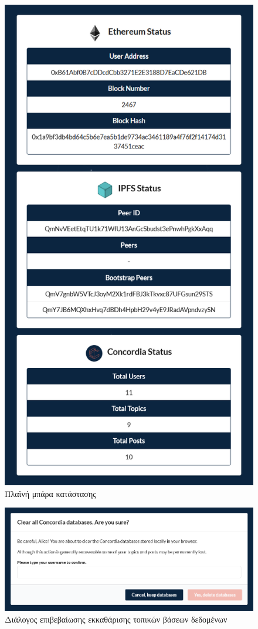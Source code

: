 \begin{figure}[H]
	\centering
	\includegraphics[width=.75\textwidth]{assets/figures/appendix-a/screenshot-10-status-sidebar}
	\caption{Πλαϊνή μπάρα κατάστασης}
\end{figure}

\begin{figure}[H]
	\centering
	\includegraphics[width=\textwidth]{assets/figures/appendix-a/screenshot-11-clear-databases-dialog}
	\caption{Διάλογος επιβεβαίωσης εκκαθάρισης τοπικών βάσεων δεδομένων}
\end{figure}


